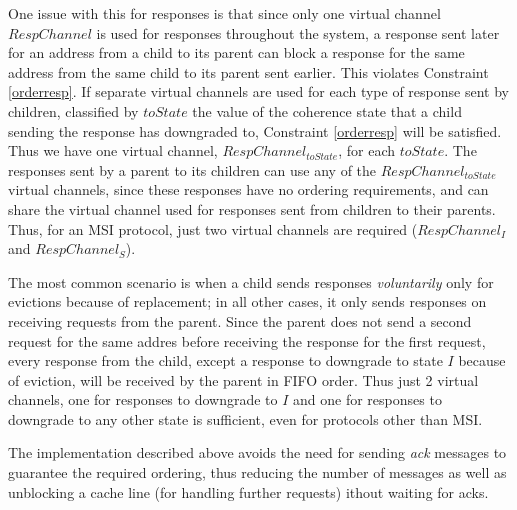 One issue with this for responses is that since only one virtual channel
$RespChannel$ is used for responses throughout the system, a response sent
later for an address from a child to its parent can block a response for the
same address from the same child to its parent sent earlier. This violates
Constraint \ref{orderresp}. If separate virtual channels are used for each type
of response sent by children, classified by $toState$ \ie the value of the
coherence state that a child sending the response has downgraded to, Constraint
\ref{orderresp} will be satisfied. Thus we have one virtual channel,
$RespChannel_{toState}$, for each $toState$. The responses sent by a parent to
its children can use any of the $RespChannel_{toState}$ virtual channels, since
these responses have no ordering requirements, and can share the virtual
channel used for responses sent from children to their parents. Thus, for an
MSI protocol, just two virtual channels are required ($RespChannel_I$ and
$RespChannel_S$).

The most common scenario is when a child sends responses \emph{voluntarily}
only for evictions because of replacement; in all other cases, it only sends
responses on receiving requests from the parent. Since the parent does not send
a second request for the same addres before receiving the response for the
first request, every response from the child, except a response to downgrade to
state $I$ because of eviction, will be received by the parent in FIFO order.
Thus just 2 virtual channels, one for responses to downgrade to $I$ and one for
responses to downgrade to any other state is sufficient, even for protocols
other than MSI.

The implementation described above avoids the need for sending \emph{ack}
messages to guarantee the required ordering, thus reducing the number of
messages as well as unblocking a cache line (for handling further requests)
ithout waiting for acks.
